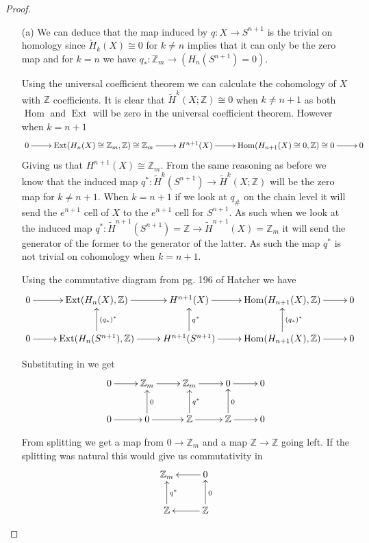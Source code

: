 \documentclass[10pt]{article}
\newcommand{\bb}[1]{\mathbb{#1}}
\newcommand{\rH}{\widetilde{H}}
\DeclareMathOperator{\Ext}{Ext}
\DeclareMathOperator{\Hom}{Hom}
\theoremstyle{remark}
\begin{document}
\begin{proof}
  \begin{itemize}
  \item[(a)]  We can deduce that the map induced by $q:X\rightarrow S^{n+1}$ is the trivial on homology
    since $\rH_k(X)\cong 0$ for $k\neq n$ implies that it can only be the zero map and for
    $k=n$ we have $q_*:\bb{Z}_m\rightarrow (H_n(S^{n+1})=0)$.

    Using the universal coefficient theorem we can calculate the cohomology of
    $X$ with $\bb{Z}$ coefficients. It is clear that $\rH^k(X;\bb{Z})\cong 0$ when
    $k\neq n+1$ as both $\Hom$ and $\Ext$ will be zero in the universal coefficient
    theorem. However when $k=n+1$
    \[
      \xymatrix{
        0 \ar[r] & \Ext(H_{n}(X)\cong \bb{Z}_m,\bb{Z})\cong \bb{Z}_m \ar[r] & H^{n+1}(X) \ar[r] & \Hom(H_{n+1}(X)\cong 0,\bb{Z})\cong 0 \ar[r] & 0\\
      }
    \]
    Giving us that $H^{n+1}(X)\cong \bb{Z}_m$. From the same reasoning as before we know
    that the induced map $q^*:\rH^k(S^{n+1})\rightarrow\rH^k(X;\bb{Z})$ will be the zero map
    for $k\neq n+1$. When $k=n+1$ if we look at $q_{\#}$ on the chain level it
    will send the $e^{n+1}$ cell of $X$ to the $e^{n+1}$ cell for $S^{n+1}$. As
    such when we look at the induced map $q^*:\rH^{n+1}(S^{n+1})=\bb{Z}\rightarrow \rH^{n+1}(X)=\bb{Z}_m$
    it will send the generator of the former to the generator of the latter. As
    such the map $q^*$ is not trivial on cohomology when $k=n+1$.

    Using the commutative diagram from pg. 196 of Hatcher we have
    \[
      \xymatrix{
        0 \ar[r] & \Ext(H_n(X),\bb{Z}) \ar[r] & H^{n+1}(X) \ar[r] & \Hom(H_{n+1}(X),\bb{Z}) \ar[r] & 0\\
        0 \ar[r] & \Ext(H_n(S^{n+1}),\bb{Z}) \ar[r] \ar[u]_{(q_*)^*} & H^{n+1}(S^{n+1}) \ar[r] \ar[u]_{q^*} & \Hom(H_{n+1}(X),\bb{Z}) \ar[r]\ar[u]_{(q_*)^*} & 0
      }
    \]

    Substituting in we get
    \[
      \xymatrix{
        0 \ar[r] & \bb{Z}_m \ar[r] & \bb{Z}_m \ar[r] & 0 \ar[r] & 0\\
        0 \ar[r] & 0 \ar[r] \ar[u]_0& \bb{Z} \ar[r] \ar[u]_{q^*}& \bb{Z} \ar[r] \ar[u]_0 & 0\\
      }
    \]

    From splitting we get a map from $0\rightarrow \bb{Z}_m$ and a map $\bb{Z}\rightarrow\bb{Z}$ going left. If
    the splitting was natural this would give us commutativity in
    \[
      \xymatrix{
        \bb{Z}_m & \ar[l] 0\\
        \bb{Z} \ar[u]_{q^*} & \ar[l] \ar[u]_0 \bb{Z}\\
      }
    \]


\end{itemize}
\end{proof}
\end{document}
